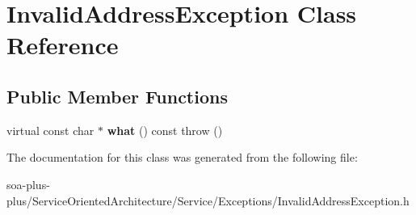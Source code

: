 \hypertarget{class_invalid_address_exception}{
\section{InvalidAddressException Class Reference}
\label{class_invalid_address_exception}
}
\subsection*{Public Member Functions}
\begin{DoxyCompactItemize}
\item 
\hypertarget{class_invalid_address_exception_a65f3a05a90982376a82dd7a5cdbfa540}{
virtual const char $\ast$ {\bfseries what} () const   throw ()}
\label{class_invalid_address_exception_a65f3a05a90982376a82dd7a5cdbfa540}

\end{DoxyCompactItemize}


The documentation for this class was generated from the following file:\begin{DoxyCompactItemize}
\item 
soa-\/plus-\/plus/ServiceOrientedArchitecture/Service/Exceptions/InvalidAddressException.h\end{DoxyCompactItemize}
